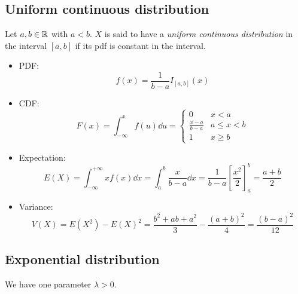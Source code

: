 \documentclass[14pt]{extarticle}
\begin{document}
\subsection{Uniform continuous distribution}

Let $a, b \in \mathbb{R}$ with $a < b$. $X$ is said to have a \emph{uniform continuous distribution} in the interval $[a, b]$ if its pdf is constant in the interval.

\begin{itemize}
    \item PDF:
          \begin{equation}
              \label{eq:uniform:pdf}
              f(x) = \frac{1}{b-a} I_{[a, b]}(x)
          \end{equation}
    \item CDF:
          \begin{equation}
              F(x) = \int_{-\infty}^x f(u) \dd{u} = \begin{cases}
                  0               & x < a        \\
                  \frac{x-a}{b-a} & a \leq x < b \\
                  1               & x \geq b
              \end{cases}
          \end{equation}
    \item Expectation:
          \begin{equation}
              E(X) = \int_{-\infty}^{+\infty} x f(x) \dd{x} = \int_a^b \frac{x}{b-a} \dd{x} = \frac{1}{b-a} \left[\frac{x^2}{2}\right]_a^b = \frac{a+b}{2}
          \end{equation}
    \item Variance:
          \begin{equation}
              V(X) = E(X^2) - E(X)^2 = \frac{b^2 + ab + a^2}{3} - \frac{(a+b)^2}{4} = \frac{(b-a)^2}{12}
          \end{equation}
\end{itemize}

\subsection{Exponential distribution}

We have one parameter $\lambda > 0$.
\end{document}
